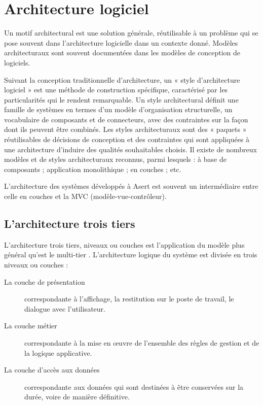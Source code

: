 
\section{Architecture logiciel}

Un motif architectural est une solution générale, réutilisable à un problème qui se pose souvent dans l'architecture logicielle dans un contexte donné. Modèles architecturaux sont souvent documentées dans les modèles de conception de logiciels. \cite{software-arch} 

Suivant la conception traditionnelle d'architecture, un « style d'architecture logiciel » est une méthode de construction spécifique, caractérisé par les particularités qui le rendent remarquable. Un style architectural définit une famille de systèmes en termes d'un modèle d'organisation structurelle, un vocabulaire de composants et de connecteurs, avec des contraintes sur la façon dont ils peuvent être combinés. Les styles architecturaux sont des « paquets » réutilisables de décisions de conception et des contraintes qui sont appliquées à une architecture d'induire des qualités souhaitables choisis. Il existe de nombreux modèles et de styles architecturaux reconnus, parmi lesquels : à base de composants ; application monolithique ; en couches ; etc. \cite{software-arch-patterns}

L'architecture des systèmes développés à Asert est souvent un intermédiaire entre celle en couches et la MVC (modèle-vue-contrôleur).

\subsection{L'architecture trois tiers}

L'architecture trois tiers, niveaux ou couches est l'application du modèle plus général qu'est le multi-tier \cite{n-tier}. L'architecture logique du système est divisée en trois niveaux ou couches : 
\begin{description}
\item[La couche de présentation] correspondante à l'affichage, la restitution sur le poste de travail, le dialogue avec l'utilisateur.
\item[La couche métier] correspondante à la mise en œuvre de l'ensemble des règles de gestion et de la logique applicative.
\item[La couche d'accès aux données] correspondante aux données qui sont destinées à être conservées sur la durée, voire de manière définitive.
\end{description}

